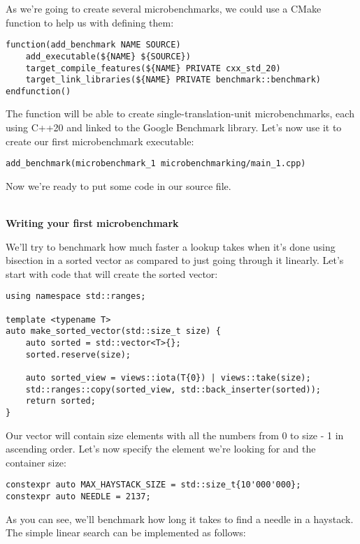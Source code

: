 As we're going to create several microbenchmarks, we could use a CMake function to help us with defining them:

\begin{lstlisting}[style=styleCMake]
function(add_benchmark NAME SOURCE)
	add_executable(${NAME} ${SOURCE})
	target_compile_features(${NAME} PRIVATE cxx_std_20)
	target_link_libraries(${NAME} PRIVATE benchmark::benchmark)
endfunction()
\end{lstlisting}

The function will be able to create single-translation-unit microbenchmarks, each using C++20 and linked to the Google Benchmark library. Let's now use it to create our first microbenchmark executable:

\begin{lstlisting}[style=styleCMake]
add_benchmark(microbenchmark_1 microbenchmarking/main_1.cpp)
\end{lstlisting}

Now we're ready to put some code in our source file.

\hspace*{\fill} \\ %
\noindent
\textbf{Writing your first microbenchmark}

We'll try to benchmark how much faster a lookup takes when it's done using bisection in a sorted vector as compared to just going through it linearly. Let's start with code that will create the sorted vector:

\begin{lstlisting}[style=styleCXX]
using namespace std::ranges;

template <typename T>
auto make_sorted_vector(std::size_t size) {
	auto sorted = std::vector<T>{};
	sorted.reserve(size);
	
	auto sorted_view = views::iota(T{0}) | views::take(size);
	std::ranges::copy(sorted_view, std::back_inserter(sorted));
	return sorted;
}
\end{lstlisting}

Our vector will contain size elements with all the numbers from 0 to size - 1 in ascending order. Let's now specify the element we're looking for and the container size:

\begin{lstlisting}[style=styleCXX]
constexpr auto MAX_HAYSTACK_SIZE = std::size_t{10'000'000};
constexpr auto NEEDLE = 2137;
\end{lstlisting}

As you can see, we'll benchmark how long it takes to find a needle in a haystack. The simple linear search can be implemented as follows:

